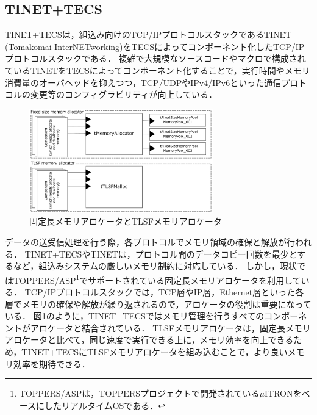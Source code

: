 \documentclass[submit,techrep]{ipsj_v2/UTF8/ipsj}
\begin{document}
\subsection{TINET+TECS}
\label{sec:TINET+TECS}

TINET+TECSは，組込み向けのTCP/IPプロトコルスタックであるTINET (Tomakomai InterNETworking)\cite{url:TINET}\cite{par:TINET}をTECSによってコンポーネント化したTCP/IPプロトコルスタックである\cite{par:TINET+TECS}．
複雑で大規模なソースコードやマクロで構成されているTINETをTECSによってコンポーネント化することで，実行時間やメモリ消費量のオーバヘッドを抑えつつ，TCP/UDPやIPv4/IPv6といった通信プロトコルの変更等のコンフィグラビリティが向上している．


\begin{figure}[t]
    \centering
    \includegraphics[width=8cm,clip]{figure/UseCase_TINET.pdf}
    \caption{固定長メモリアロケータとTLSFメモリアロケータ}
    \label{fig:UseCase_TINET}
\end{figure}

データの送受信処理を行う際，各プロトコルでメモリ領域の確保と解放が行われる．
TINET+TECSやTINETは，プロトコル間のデータコピー回数を最少とするなど，組込みシステムの厳しいメモリ制約に対応している．
しかし，現状ではTOPPERS/ASP\footnote{TOPPERS/ASPは，TOPPERSプロジェクトで開発されている$\mu$ITRON\cite{par:microITRON}をベースにしたリアルタイムOSである．}でサポートされている固定長メモリアロケータを利用している．
TCP/IPプロトコルスタックでは，TCP層やIP層，Ethernet層といった各層でメモリの確保や解放が繰り返されるので，アロケータの役割は重要になっている．
図\ref{fig:UseCase_TINET}のように，TINET+TECSではメモリ管理を行うすべてのコンポーネントがアロケータと結合されている．
TLSFメモリアロケータは，固定長メモリアロケータと比べて，同じ速度で実行できる上に，メモリ効率を向上できるため，TINET+TECSにTLSFメモリアロケータを組み込むことで，より良いメモリ効率を期待できる．
\end{document}
